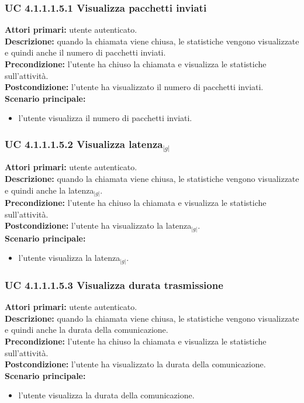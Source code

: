 \subsubsection{UC 4.1.1.1.5.1 Visualizza pacchetti inviati}
\noindent
\textbf{Attori primari:} utente autenticato.\\
\textbf{Descrizione:} quando la chiamata viene chiusa, le statistiche vengono visualizzate e quindi anche il numero di pacchetti inviati.\\
\textbf{Precondizione:} l'utente ha chiuso la chiamata e visualizza le statistiche sull'attività.\\
\textbf{Postcondizione:} l'utente ha visualizzato il numero di pacchetti inviati.\\
\textbf{Scenario principale:}
\begin{itemize}
\item l'utente visualizza il numero di pacchetti inviati.
\end{itemize}

\subsubsection{UC 4.1.1.1.5.2 Visualizza latenza$_{|g|}$}
\noindent
\textbf{Attori primari:} utente autenticato.\\
\textbf{Descrizione:} quando la chiamata viene chiusa, le statistiche vengono visualizzate e quindi anche la latenza$_{|g|}$.\\
\textbf{Precondizione:} l'utente ha chiuso la chiamata e visualizza le statistiche sull'attività.\\
\textbf{Postcondizione:} l'utente ha visualizzato la latenza$_{|g|}$.\\
\textbf{Scenario principale:}
\begin{itemize}
\item l'utente visualizza la latenza$_{|g|}$.
\end{itemize}

\subsubsection{UC 4.1.1.1.5.3 Visualizza durata trasmissione}
\noindent
\textbf{Attori primari:} utente autenticato.\\
\textbf{Descrizione:} quando la chiamata viene chiusa, le statistiche vengono visualizzate e quindi anche la durata della comunicazione.\\
\textbf{Precondizione:} l'utente ha chiuso la chiamata e visualizza le statistiche sull'attività.\\
\textbf{Postcondizione:} l'utente ha visualizzato la durata della comunicazione.\\
\textbf{Scenario principale:}
\begin{itemize}
\item l'utente visualizza la durata della comunicazione.
\end{itemize}

